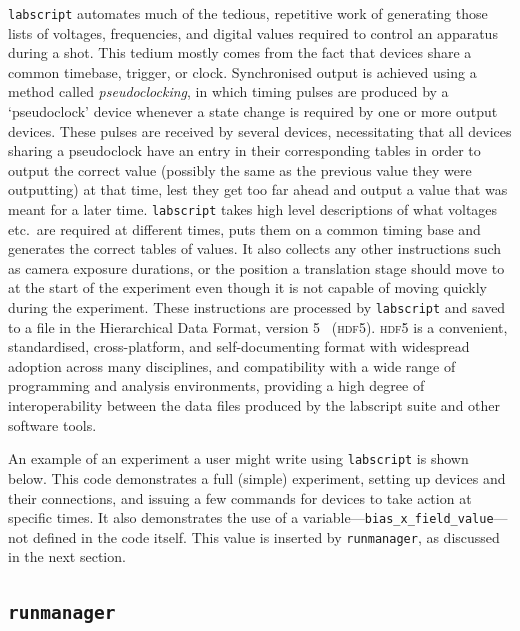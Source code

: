 \texttt{labscript} automates much of the tedious, repetitive work of generating those lists of voltages, frequencies, and digital values required to control an apparatus during a shot. This tedium mostly comes from the fact that devices share a common timebase, trigger, or clock. Synchronised output is achieved using a method called \emph{pseudoclocking}, in which timing pulses are produced by a `pseudoclock' device whenever a state change is required by one or more output devices. These pulses are received by several devices, necessitating that all devices sharing a pseudoclock have an entry in their corresponding tables in order to output the correct value (possibly the same as the previous value they were outputting) at that time, lest they get too far ahead and output a value that was meant for a later time. \texttt{labscript} takes high level descriptions of what voltages etc.~are required at different times, puts them on a common timing base and generates the correct tables of values. It also collects any other instructions such as camera exposure durations, or the position a translation stage should move to at the start of the experiment even though it is not capable of moving quickly during the experiment. These instructions are processed by \texttt{labscript} and saved to a file in the Hierarchical Data Format, version 5~\cite{the_hdf_group_hierarchical_1997} (\textsc{hdf5}). \textsc{hdf5} is a convenient, standardised, cross-platform, and self-documenting format with widespread adoption across many disciplines, and compatibility with a wide range of programming and analysis environments, providing a high degree of interoperability between the data files produced by the labscript suite and other software tools.

An example of an experiment a user might write using \texttt{labscript} is shown below. This code demonstrates a full (simple) experiment, setting up devices and their connections, and issuing a few commands for devices to take action at specific times. It also demonstrates the use of a variable---\texttt{bias\_x\_field\_value}---not defined in the code itself. This value is inserted by \texttt{runmanager}, as discussed in the next section.


\subsection{\texttt{runmanager}}

